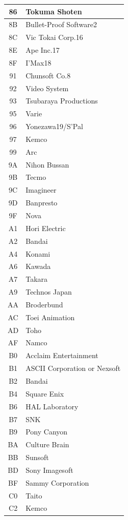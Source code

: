\begin{longtable}{|c|l|}
86 & Tokuma Shoten \\\hline
8B & Bullet-Proof Software2 \\\hline
8C & Vic Tokai Corp.16 \\\hline
8E & Ape Inc.17 \\\hline
8F & I’Max18 \\\hline
91 & Chunsoft Co.8 \\\hline
92 & Video System \\\hline
93 & Tsubaraya Productions \\\hline
95 & Varie \\\hline
96 & Yonezawa19/S’Pal \\\hline
97 & Kemco \\\hline
99 & Arc \\\hline
9A & Nihon Bussan \\\hline
9B & Tecmo \\\hline
9C & Imagineer \\\hline
9D & Banpresto \\\hline
9F & Nova \\\hline
A1 & Hori Electric \\\hline
A2 & Bandai \\\hline
A4 & Konami \\\hline
A6 & Kawada \\\hline
A7 & Takara \\\hline
A9 & Technos Japan \\\hline
AA & Broderbund \\\hline
AC & Toei Animation \\\hline
AD & Toho \\\hline
AF & Namco \\\hline
B0 & Acclaim Entertainment \\\hline
B1 & ASCII Corporation or Nexsoft \\\hline
B2 & Bandai \\\hline
B4 & Square Enix \\\hline
B6 & HAL Laboratory \\\hline
B7 & SNK \\\hline
B9 & Pony Canyon \\\hline
BA & Culture Brain \\\hline
BB & Sunsoft \\\hline
BD & Sony Imagesoft \\\hline
BF & Sammy Corporation \\\hline
C0 & Taito \\\hline
C2 & Kemco \\\hline

\end{longtable}
